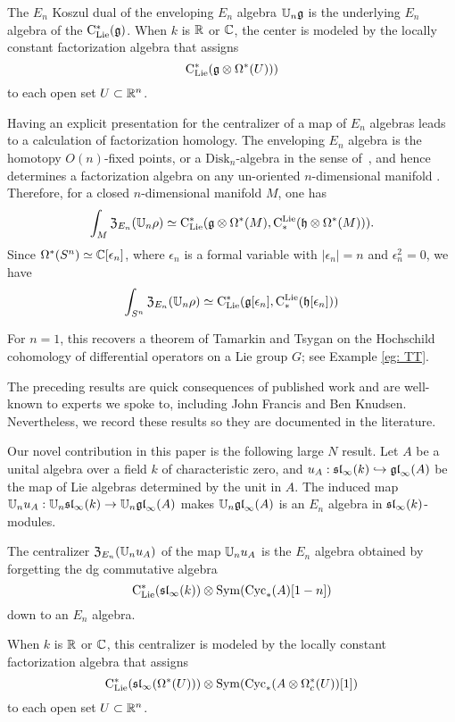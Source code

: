 \documentclass[11pt]{amsart}
\numberwithin{equation}{section}
\begin{document}
\begin{cor}
\label{thm: koszul}
The $E_n$ Koszul dual of the enveloping $E_n$ algebra $\UU_n\fg$ is the underlying $E_n$ algebra of the $\clies(\fg)$. 
When $k$ is $\RR$ or $\CC$, the 
center is modeled by the locally constant factorization algebra that assigns
\[
\clies(\fg \otimes \Omega^*(U)))
\]
to each open set $U \subset \RR^n$.
\end{cor}

Having an explicit presentation for the centralizer of a map of $E_n$ algebras leads to a calculation of factorization homology. The enveloping $E_n$ algebra is the homotopy $O(n)$-fixed points, or a $\mathrm{Disk}_n$-algebra in the sense of~\cite{AF}, and hence determines a factorization algebra on any un-oriented $n$-dimensional manifold \cite{Knudsen}. Therefore, for a closed $n$-dimensional manifold $M$, one has
\[
\int_M {\frak Z}_{E_n}(\UU_n \rho) \simeq \clies(\fg \otimes \Omega^*(M), \cliels( \fh \otimes \Omega^*(M))).
\]
Since $\Omega^*(S^n) \simeq \CC[\epsilon_n]$, where $\epsilon_n$ is a formal variable with $|\epsilon_n| = n$ and $\epsilon_n^2 = 0$, we have
\[
\int_{S^n} {\frak Z}_{E_n}(\UU_n \rho) \simeq \clies(\fg[\epsilon_n], \cliels( \fh[\epsilon_n]))
\]

For $n=1$, this recovers a theorem of Tamarkin and Tsygan \cite{TT} on the Hochschild cohomology of differential operators on a Lie group $G$; see Example \ref{eg: TT}. 

\begin{rmk}
The preceding results are quick consequences of published work and are well-known to experts we spoke to, including John Francis and Ben Knudsen. Nevertheless, we record these results so they are documented in the literature.
\end{rmk}

Our novel contribution in this paper is the following large $N$ result. Let $A$ be a unital algebra over a field $k$ of characteristic zero, and $u_A: \sl_\infty(k) \hookrightarrow \gl_\infty(A)$ be the map of Lie algebras determined by the unit in $A$. The induced map $\UU_nu_A: \UU_n\sl_\infty(k) \to \UU_n\gl_\infty(A)$ makes $\UU_n\gl_\infty(A)$ is an $E_n$ algebra in $\sl_\infty(k)$-modules.

\begin{thm}
\label{thm: large N}

The centralizer ${\frak Z}_{E_n}(\UU_nu_A)$ of the map $\UU_nu_A$ is the $E_n$ algebra obtained by forgetting the dg commutative algebra
\[
\clies(\sl_\infty(k)) \otimes \Sym(\Cyc_*(A)[1-n])
\]
down to an $E_n$ algebra.

When $k$ is $\RR$ or $\CC$, this centralizer is modeled by the locally constant factorization algebra that assigns
\[
\clies(\sl_\infty(\Omega^*(U)))\otimes \Sym(\Cyc_*(A \otimes \Omega^*_c(U))[1])
\]
to each open set $U \subset \RR^n$.
\end{thm}
\end{document}
